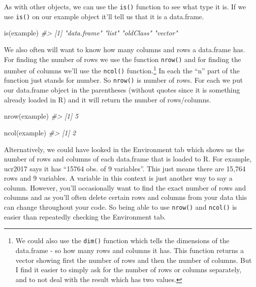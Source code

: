 \documentclass[
]{krantz}
\makeatletter
\newenvironment{Shaded}{\begin{snugshade}}{\end{snugshade}}
\newcommand{\CommentTok}[1]{\textcolor[rgb]{0.37,0.37,0.37}{\textit{#1}}}
\newcommand{\FunctionTok}[1]{\textcolor[rgb]{0,0,0}{#1}}
\newcommand{\NormalTok}[1]{#1}
\newenvironment{kframe}{%
\medskip{}
\setlength{\fboxsep}{.8em}
 \def\at@end@of@kframe{}%
 \ifinner\ifhmode%
  \def\at@end@of@kframe{\end{minipage}}%
  \begin{minipage}{\columnwidth}%
 \fi\fi%
 \def\FrameCommand##1{\hskip\@totalleftmargin \hskip-\fboxsep
 \colorbox{shadecolor}{##1}\hskip-\fboxsep
     \hskip-\linewidth \hskip-\@totalleftmargin \hskip\columnwidth}%
 \MakeFramed {\advance\hsize-\width
   \@totalleftmargin\z@ \linewidth\hsize
   \@setminipage}}%
 {\par\unskip\endMakeFramed%
 \at@end@of@kframe}
\renewenvironment{Shaded}{\begin{kframe}}{\end{kframe}}
\makeatother
\begin{document}
As with other objects, we can use the \texttt{is()} function
to see what type it is. If we use \texttt{is()} on our
example object it'll tell us that it is a data.frame.

\begin{Shaded}
\begin{Highlighting}[]
\FunctionTok{is}\NormalTok{(example)}
\CommentTok{\#\textgreater{} [1] "data.frame" "list"       "oldClass"   "vector"}
\end{Highlighting}
\end{Shaded}

We also often will want to know how many columns and rows a
data.frame has. For finding the number of rows we use the
function \texttt{nrow()} and for finding the number of
columns we'll use the \texttt{ncol()} function.\footnote{We
  could also use the \texttt{dim()} function which tells the
  dimensions of the data.frame - so how many rows and
  columns it has. This function returns a vector showing
  first the number of rows and then the number of columns.
  But I find it easier to simply ask for the number of rows
  or columns separately, and to not deal with the result
  which has two values.} In each the ``n'' part of the
function just stands for number. So \texttt{nrow()} is
number of rows. For each we put our data.frame object in the
parentheses (without quotes since it is something already
loaded in R) and it will return the number of rows/columns.

\begin{Shaded}
\begin{Highlighting}[]
\FunctionTok{nrow}\NormalTok{(example)}
\CommentTok{\#\textgreater{} [1] 5}
\end{Highlighting}
\end{Shaded}

\begin{Shaded}
\begin{Highlighting}[]
\FunctionTok{ncol}\NormalTok{(example)}
\CommentTok{\#\textgreater{} [1] 2}
\end{Highlighting}
\end{Shaded}

Alternatively, we could have looked in the Environment tab
which shows us the number of rows and columns of each
data.frame that is loaded to R. For example, ucr2017 says it
has ``15764 obs. of 9 variables''. This just means there are
15,764 rows and 9 variables. A variable in this context is
just another way to say a column. However, you'll
occasionally want to find the exact number of rows and
columns and as you'll often delete certain rows and columns
from your data this can change throughout your code. So
being able to use \texttt{nrow()} and \texttt{ncol()} is
easier than repeatedly checking the Environment tab.
\end{document}

